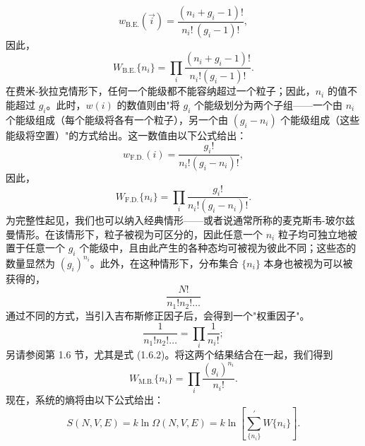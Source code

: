 \begin{equation}\tag{6.1.3}\label{eq:6.1.3}
w _ { \mathrm { B . E . } } ( \vec { i } ) = \frac { ( n _ { i } + g _ { i } - 1 ) ! } { n _ { i } ! \, ( g _ { i } - 1 ) ! } ,
\end{equation}
因此，
\begin{equation}\tag{6.1.4}\label{eq:6.1.4}
W _ { \mathrm { B . E . } } \{ n _ { i } \} = \prod _ { i } \frac { ( n _ { i } + g _ { i } - 1 ) ! } { n _ { i } ! ( g _ { i } - 1 ) ! } .
\end{equation}
在费米-狄拉克情形下，任何一个能级都不能容纳超过一个粒子；因此，\(n_{i}\) 的值不能超过 \(g_{i}\)。此时，\(w(i)\) 的数值则由"将 \(g_{i}\) 个能级划分为两个子组——一个由 \(n_{i}\) 个能级组成（每个能级将各有一个粒子），另一个由 \((g_{i} - n_{i})\) 个能级组成（这些能级将空置）"的方式给出。这一数值由以下公式给出：
\begin{equation}\tag{6.1.5}\label{eq:6.1.5}
w _ { \mathrm { F . D . } } ( i ) = \frac { g _ { i } ! } { n _ { i } ! \left( g _ { i } - n _ { i } \right) ! } ,
\end{equation}
因此，
\begin{equation}\tag{6.1.6}\label{eq:6.1.6}
W _ { \mathrm { F . D . } } \{ n _ { i } \} = \prod _ { i } \frac { g _ { i } ! } { n _ { i } ! ( g _ { i } - n _ { i } ) ! } .
\end{equation}
为完整性起见，我们也可以纳入经典情形——或者说通常所称的麦克斯韦-玻尔兹曼情形。在该情形下，粒子被视为可区分的，因此任意一个 \(n_i\) 粒子均可独立地被置于任意一个 \(g_i\) 个能级中，且由此产生的各种态均可被视为彼此不同；这些态的数量显然为 \((g_i)^{n_i}\)。此外，在这种情形下，分布集合 \(\{n_i\}\) 本身也被视为可以被获得的，
\begin{equation}\tag{6.1.7}\label{eq:6.1.7}
\frac { N ! } { n _ { 1 } ! n _ { 2 } ! \ldots }
\end{equation}
通过不同的方式，当引入吉布斯修正因子后，会得到一个"权重因子"。
\begin{equation}\tag{6.1.8}\label{eq:6.1.8}
\frac { 1 } { n _ { 1 } ! n _ { 2 } ! \ldots } = \prod _ { i } \frac { 1 } { n _ { i } ! } ;
\end{equation}
另请参阅第 1.6 节，尤其是式 (1.6.2)。将这两个结果结合在一起，我们得到
\begin{equation}\tag{6.1.9}\label{eq:6.1.9}
W _ { \mathrm { M . B . } } \{ n _ { i } \} = \prod _ { i } \frac { ( g _ { i } ) ^{n _ { i} } } { n _ { i } ! } .
\end{equation}
现在，系统的熵将由以下公式给出：
\begin{equation}\tag{6.1.10}\label{eq:6.1.10}
S ( N , V , E ) = k \ln \Omega ( N , V , E ) = k \ln \left[ \sum _ { \{ n _ { i } \} } ^{\prime} W \{ n _ { i } \} \right] .
\end{equation}
